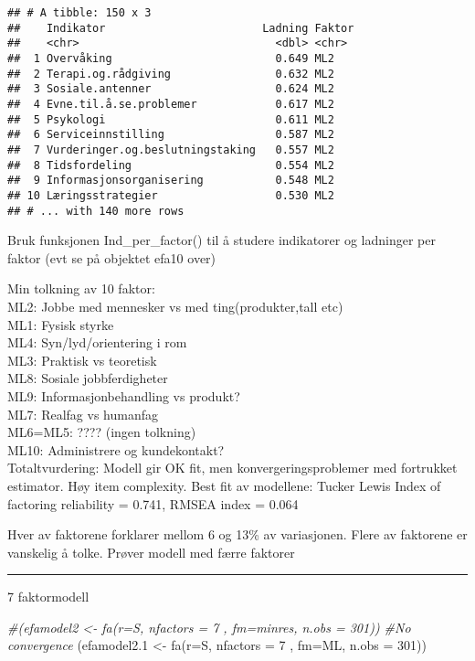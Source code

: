\documentclass[
]{article}
\newenvironment{Shaded}{\begin{snugshade}}{\end{snugshade}}
\newcommand{\AttributeTok}[1]{\textcolor[rgb]{0.77,0.63,0.00}{#1}}
\newcommand{\CommentTok}[1]{\textcolor[rgb]{0.56,0.35,0.01}{\textit{#1}}}
\newcommand{\DecValTok}[1]{\textcolor[rgb]{0.00,0.00,0.81}{#1}}
\newcommand{\FloatTok}[1]{\textcolor[rgb]{0.00,0.00,0.81}{#1}}
\newcommand{\FunctionTok}[1]{\textcolor[rgb]{0.00,0.00,0.00}{#1}}
\newcommand{\NormalTok}[1]{#1}
\newcommand{\OtherTok}[1]{\textcolor[rgb]{0.56,0.35,0.01}{#1}}
\newcommand{\StringTok}[1]{\textcolor[rgb]{0.31,0.60,0.02}{#1}}
\begin{document}
\begin{verbatim}
## # A tibble: 150 x 3
##    Indikator                        Ladning Faktor
##    <chr>                              <dbl> <chr> 
##  1 Overvåking                         0.649 ML2   
##  2 Terapi.og.rådgiving                0.632 ML2   
##  3 Sosiale.antenner                   0.624 ML2   
##  4 Evne.til.å.se.problemer            0.617 ML2   
##  5 Psykologi                          0.611 ML2   
##  6 Serviceinnstilling                 0.587 ML2   
##  7 Vurderinger.og.beslutningstaking   0.557 ML2   
##  8 Tidsfordeling                      0.554 ML2   
##  9 Informasjonsorganisering           0.548 ML2   
## 10 Læringsstrategier                  0.530 ML2   
## # ... with 140 more rows
\end{verbatim}

Bruk funksjonen Ind\_per\_factor() til å studere indikatorer og
ladninger per faktor (evt se på objektet efa10 over)

Min tolkning av 10 faktor:\\
ML2: Jobbe med mennesker vs med ting(produkter,tall etc)\\
ML1: Fysisk styrke\\
ML4: Syn/lyd/orientering i rom\\
ML3: Praktisk vs teoretisk\\
ML8: Sosiale jobbferdigheter\\
ML9: Informasjonbehandling vs produkt?\\
ML7: Realfag vs humanfag\\
ML6=ML5: ???? (ingen tolkning)\\
ML10: Administrere og kundekontakt?\\

Totaltvurdering: Modell gir OK fit, men konvergeringsproblemer med
fortrukket estimator. Høy item complexity. Best fit av modellene: Tucker
Lewis Index of factoring reliability = 0.741, RMSEA index = 0.064

Hver av faktorene forklarer mellom 6 og 13\% av variasjonen. Flere av
faktorene er vanskelig å tolke. Prøver modell med færre faktorer

\begin{center}\rule{0.5\linewidth}{0.5pt}\end{center}

7 faktormodell

\begin{Shaded}
\begin{Highlighting}[]
\CommentTok{\#(efamodel2 \textless{}{-} fa(r=S, nfactors = 7 , fm=\textquotesingle{}minres\textquotesingle{}, n.obs = 301)) \#No convergence}
\NormalTok{(efamodel2}\FloatTok{.1} \OtherTok{\textless{}{-}} \FunctionTok{fa}\NormalTok{(}\AttributeTok{r=}\NormalTok{S, }\AttributeTok{nfactors =} \DecValTok{7}\NormalTok{ , }\AttributeTok{fm=}\StringTok{\textquotesingle{}ML\textquotesingle{}}\NormalTok{, }\AttributeTok{n.obs =} \DecValTok{301}\NormalTok{))}
\end{Highlighting}
\end{Shaded}
\end{document}
